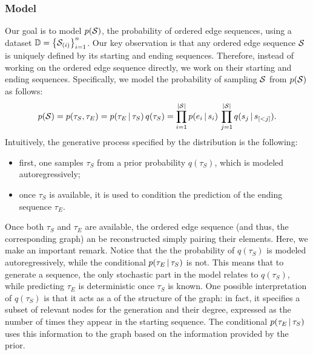 \subsubsection*{Model}
Our goal is to model $p(\OES{S})$, the probability of ordered edge sequences, using a dataset $\Data = \Set{\OES{S}_{(i)}}_{i=1}^n$. Our key observation is that any ordered edge sequence $\OES{S}$ is uniquely defined by its starting and ending sequences. Therefore, instead of working on the ordered edge sequence directly, we work on their starting and ending sequences. Specifically, we model the probability of sampling $\OES{S}$ from $p(\OES{S})$ as follows:
$$p(\OES{S}) = p(\tau_S, \tau_E) = p(\tau_E \given \tau_S)\, q(\tau_S) = \prod_{i=1}^{|\OES{S}|} p(e_i \given s_i)\, \prod_{j=1}^{|\OES{S}|} q(s_j \given s_{[<j]}).$$
Intuitively, the generative process specified by the distribution is the following:
\begin{itemize}
    \item first, one samples $\tau_S$ from a prior probability $q(\tau_S)$, which is modeled autoregressively;
    \item once $\tau_S$ is available, it is used to condition the prediction of the ending sequence $\tau_E$.
\end{itemize}
Once both $\tau_S$ and $\tau_E$ are available, the ordered edge sequence (and thus, the corresponding graph) an be reconstructed simply pairing their elements. Here, we make an important remark. Notice that the the probability of $q(\tau_S)$ is modeled autoregressively, while the conditional $p(\tau_E \,|\, \tau_S)$ is not. This means that to generate a sequence, the only stochastic part in the model relates to $q(\tau_S)$, while predicting $\tau_E$ is deterministic once $\tau_S$ is known. One possible interpretation of $q(\tau_S)$ is that it acts as a  of the structure of the graph: in fact, it specifies a subset of relevant nodes for the generation and their degree, expressed as the number of times they appear in the starting sequence. The conditional $p(\tau_E \,|\, \tau_S)$ uses this information to  the graph based on the information provided by the prior.

